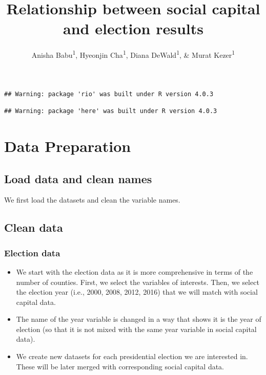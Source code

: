 \documentclass[
  english,
  man]{apa6}
\title{Relationship between social capital and election results}
\author{Anisha Babu\textsuperscript{1}, Hyeonjin Cha\textsuperscript{1}, Diana DeWald\textsuperscript{1}, \& Murat Kezer\textsuperscript{1}}
\date{}
\affiliation{\vspace{0.5cm}\textsuperscript{1} University of Oregon}
\begin{document}
\maketitle

\begin{verbatim}
## Warning: package 'rio' was built under R version 4.0.3
\end{verbatim}

\begin{verbatim}
## Warning: package 'here' was built under R version 4.0.3
\end{verbatim}

\hypertarget{data-preparation}{%
\section{Data Preparation}\label{data-preparation}}

\hypertarget{load-data-and-clean-names}{%
\subsection{Load data and clean names}\label{load-data-and-clean-names}}

We first load the datasets and clean the variable names.

\hypertarget{clean-data}{%
\subsection{Clean data}\label{clean-data}}

\hypertarget{election-data}{%
\subsubsection{Election data}\label{election-data}}

\begin{itemize}
\item
  We start with the election data as it is more comprehensive in terms of the number of counties. First, we select the variables of interests. Then, we select the election year (i.e., 2000, 2008, 2012, 2016) that we will match with social capital data.
\item
  The name of the year variable is changed in a way that shows it is the year of election (so that it is not mixed with the same year variable in social capital data).
\item
  We create new datasets for each presidential election we are interested in. These will be later merged with corresponding social capital data.
\end{itemize}
\end{document}
